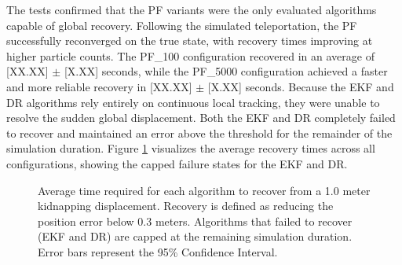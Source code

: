 The tests confirmed that the PF variants were the only evaluated algorithms capable of global recovery. 
Following the simulated teleportation, the PF successfully reconverged on the true state, with recovery times improving at higher particle counts. 
The PF\_100 configuration recovered in an average of [XX.XX] $\pm$ [X.XX] seconds, while the PF\_5000 configuration achieved a faster and more reliable recovery in [XX.XX] $\pm$ [X.XX] seconds. 
Because the EKF and DR algorithms rely entirely on continuous local tracking, they were unable to resolve the sudden global displacement. 
Both the EKF and DR completely failed to recover and maintained an error above the threshold for the remainder of the simulation duration. 
Figure \ref{fig:recovery_time} visualizes the average recovery times across all configurations, showing the capped failure states for the EKF and DR.

\begin{figure}[!htbp]
    \centering
    \caption{Average time required for each algorithm to recover from a 1.0 meter kidnapping displacement. 
    Recovery is defined as reducing the position error below 0.3 meters. 
    Algorithms that failed to recover (EKF and DR) are capped at the remaining simulation duration. 
    Error bars represent the 95\% Confidence Interval.}
    \label{fig:recovery_time}
\end{figure}